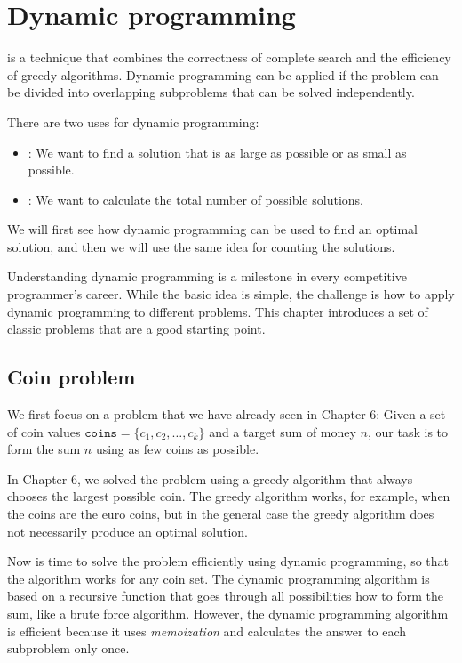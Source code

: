 \chapter{Dynamic programming}


is a technique that combines the correctness
of complete search and the efficiency
of greedy algorithms.
Dynamic programming can be applied if the
problem can be divided into overlapping subproblems
that can be solved independently.

There are two uses for dynamic programming:

\begin{itemize}
\item
{}:
We want to find a solution that is
as large as possible or as small as possible.
\item
{}:
We want to calculate the total number of
possible solutions.
\end{itemize}

We will first see how dynamic programming can
be used to find an optimal solution,
and then we will use the same idea for
counting the solutions.

Understanding dynamic programming is a milestone
in every competitive programmer's career.
While the basic idea is simple,
the challenge is how to apply
dynamic programming to different problems.
This chapter introduces a set of classic problems
that are a good starting point.

\section{Coin problem}

We first focus on a problem that we
have already seen in Chapter 6:
Given a set of coin values $\texttt{coins} = \{c_1,c_2,\ldots,c_k\}$
and a target sum of money $n$, our task is to
form the sum $n$ using as few coins as possible.

In Chapter 6, we solved the problem using a
greedy algorithm that always chooses the largest
possible coin.
The greedy algorithm works, for example,
when the coins are the euro coins,
but in the general case the greedy algorithm
does not necessarily produce an optimal solution.

Now is time to solve the problem efficiently
using dynamic programming, so that the algorithm
works for any coin set.
The dynamic programming
algorithm is based on a recursive function
that goes through all possibilities how to
form the sum, like a brute force algorithm.
However, the dynamic programming
algorithm is efficient because
it uses \emph{memoization} and
calculates the answer to each subproblem only once.

